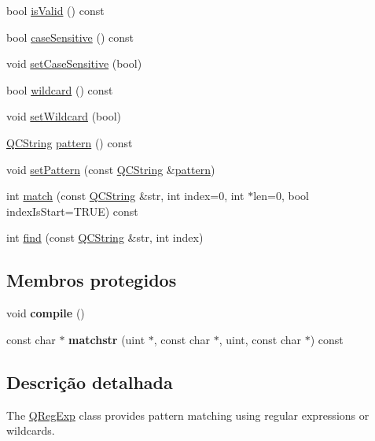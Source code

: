 \begin{DoxyCompactItemize}
\item 
bool \hyperlink{class_q_reg_exp_aac1b70a2ed67ead038c4d3f5ac4d8a81}{is\-Valid} () const 
\item 
bool \hyperlink{class_q_reg_exp_a8ffc24a7e547c9f11973ad94ce366080}{case\-Sensitive} () const 
\item 
void \hyperlink{class_q_reg_exp_a032175887f1e496e4099313b7ec1063f}{set\-Case\-Sensitive} (bool)
\item 
bool \hyperlink{class_q_reg_exp_ad838556c640e5d5c418e8d1fb9cbf5cb}{wildcard} () const 
\item 
void \hyperlink{class_q_reg_exp_a6ac74ec243f51186b8c2e06e00ea0749}{set\-Wildcard} (bool)
\item 
\hyperlink{class_q_c_string}{Q\-C\-String} \hyperlink{class_q_reg_exp_af38e77edbe06b9cb201001d58a50f49d}{pattern} () const 
\item 
void \hyperlink{class_q_reg_exp_ae13f3d949a61ba869d63789763374577}{set\-Pattern} (const \hyperlink{class_q_c_string}{Q\-C\-String} \&\hyperlink{class_q_reg_exp_af38e77edbe06b9cb201001d58a50f49d}{pattern})
\item 
int \hyperlink{class_q_reg_exp_a8c7e384c5df80bfe711ab7890f6a07db}{match} (const \hyperlink{class_q_c_string}{Q\-C\-String} \&str, int index=0, int $\ast$len=0, bool index\-Is\-Start=T\-R\-U\-E) const 
\item 
int \hyperlink{class_q_reg_exp_a464c432b16caef875a4aa96af48a54e3}{find} (const \hyperlink{class_q_c_string}{Q\-C\-String} \&str, int index)
\end{DoxyCompactItemize}
\subsection*{Membros protegidos}
\begin{DoxyCompactItemize}
\item 
\hypertarget{class_q_reg_exp_acafe5ede9412674127cd08795647f26a}{void {\bfseries compile} ()}\label{class_q_reg_exp_acafe5ede9412674127cd08795647f26a}

\item 
\hypertarget{class_q_reg_exp_a4ddf296f5e56c7c565e1049175fd8c9f}{const char $\ast$ {\bfseries matchstr} (uint $\ast$, const char $\ast$, uint, const char $\ast$) const }\label{class_q_reg_exp_a4ddf296f5e56c7c565e1049175fd8c9f}

\end{DoxyCompactItemize}


\subsection{Descrição detalhada}
The \hyperlink{class_q_reg_exp}{Q\-Reg\-Exp} class provides pattern matching using regular expressions or wildcards. 

